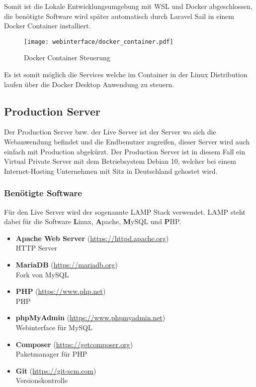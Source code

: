 Somit ist die Lokale Entwicklungsumgebung mit WSL und Docker abgeschlossen, die
benötigte Software wird später automatisch durch Laravel Sail in einem Docker
Container installiert.

\begin{figure}[H]
  \centering
  \texttt{[image: webinterface/docker\_container.pdf]}
  \caption{Docker Container Steuerung}
\end{figure}

Es ist somit möglich die Services welche im Container in der Linux Distribution
laufen über die Docker Desktop Anwendung zu steuern.


\subsection{Production Server}
Der Production Server bzw. der Live Server ist der Server wo sich die
Webanwendung befindet und die Endbenutzer zugreifen, dieser Server wird auch
einfach mit Production abgekürzt. Der Production Server ist in diesem Fall ein
Virtual Private Server mit dem Betriebsystem Debian 10, welcher bei einem
Internet-Hosting Unternehmen mit Sitz in Deutschland gehostet wird.


\subsubsection{Benötigte Software}

Für den Live Server wird der sogenannte \glqq LAMP\grqq{} Stack verwendet. LAMP steht dabei
für die Software \textbf{L}inux, \textbf{A}pache, \textbf{M}ySQL und \textbf{P}HP.

\begin{itemize}
  \item \textbf{Apache Web Server} (\url{https://httpd.apache.org}) \\ HTTP Server
  \item \textbf{MariaDB} (\url{https://mariadb.org}) \\ Fork von MySQL
  \item \textbf{PHP} (\url{https://www.php.net}) \\ \ac*{PHP}
  \item \textbf{phpMyAdmin} (\url{https://www.phpmyadmin.net}) \\ Webinterface
        für MySQL
  \item \textbf{Composer} (\url{https://getcomposer.org}) \\ Paketmanager für PHP
  \item \textbf{Git} (\url{https://git-scm.com}) \\ Versionskontrolle
\end{itemize}


